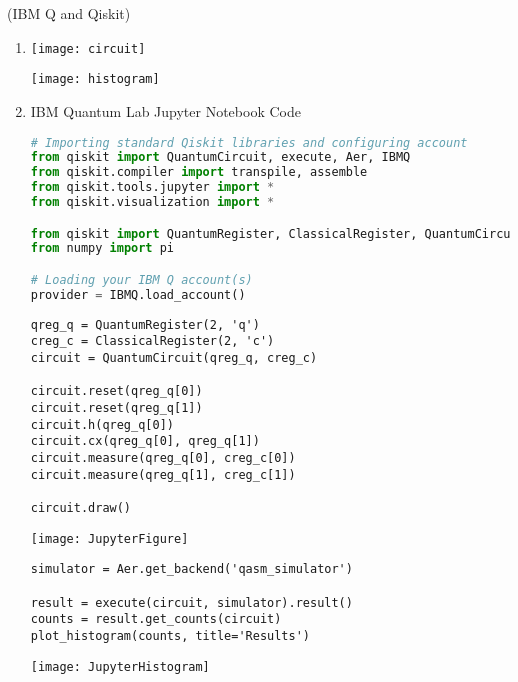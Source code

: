 \documentclass[a4paper,12pt]{article}
\begin{document}
 (IBM Q and Qiskit)

\begin{enumerate}[label=(\alph*)]
    \item
          \begin{minipage}[t]{\linewidth}
              \texttt{[image: circuit]}
          \end{minipage}
          \begin{minipage}[t]{\linewidth}
              \texttt{[image: histogram]}
          \end{minipage}
    \item
          IBM Quantum Lab Jupyter Notebook Code
          \begin{lstlisting}[language=Python]
%matplotlib inline
# Importing standard Qiskit libraries and configuring account
from qiskit import QuantumCircuit, execute, Aer, IBMQ
from qiskit.compiler import transpile, assemble
from qiskit.tools.jupyter import *
from qiskit.visualization import *

from qiskit import QuantumRegister, ClassicalRegister, QuantumCircuit
from numpy import pi

# Loading your IBM Q account(s)
provider = IBMQ.load_account()
        \end{lstlisting}
          \begin{lstlisting}
qreg_q = QuantumRegister(2, 'q')
creg_c = ClassicalRegister(2, 'c')
circuit = QuantumCircuit(qreg_q, creg_c)

circuit.reset(qreg_q[0])
circuit.reset(qreg_q[1])
circuit.h(qreg_q[0])
circuit.cx(qreg_q[0], qreg_q[1])
circuit.measure(qreg_q[0], creg_c[0])
circuit.measure(qreg_q[1], creg_c[1])

circuit.draw()
        \end{lstlisting}
          \begin{minipage}[t]{\linewidth}
              \texttt{[image: JupyterFigure]}
          \end{minipage}
          \begin{lstlisting}
simulator = Aer.get_backend('qasm_simulator')

result = execute(circuit, simulator).result()
counts = result.get_counts(circuit)
plot_histogram(counts, title='Results')
        \end{lstlisting}
          \begin{minipage}[t]{\linewidth}
              \texttt{[image: JupyterHistogram]}
          \end{minipage}

\end{enumerate}
\end{document}
